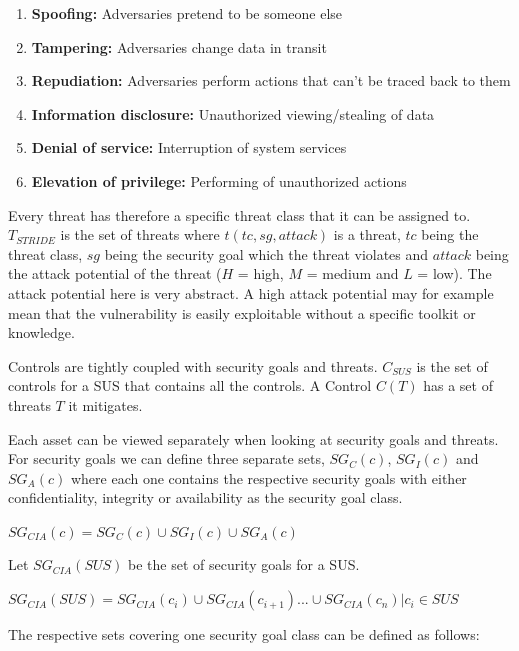 \begin{enumerate}
\item[]\textbf{Spoofing:} Adversaries pretend to be someone else
\item[]\textbf{Tampering:} Adversaries change data in transit
\item[]\textbf{Repudiation:} Adversaries perform actions that can't be traced back to them
\item[]\textbf{Information disclosure:} Unauthorized viewing/stealing of data
\item[]\textbf{Denial of service:} Interruption of system services
\item[]\textbf{Elevation of privilege:} Performing of unauthorized actions
\end{enumerate}

Every threat has therefore a specific threat class that it can be assigned to. $T_{STRIDE}$ is the set of threats where $t(tc, sg, attack)$ is a threat, $tc$ being the threat class, $sg$ being the security goal which the threat violates and $attack$ being the attack potential of the threat ($H$ = high, $M$ = medium and $L$ = low). The attack potential here is very abstract. A high attack potential may for example mean that the vulnerability is easily exploitable without a specific toolkit or knowledge.

Controls are tightly coupled with security goals and threats. $C_{SUS}$ is the set of controls for a SUS that contains all the controls. A Control $C(T)$ has a set of threats $T$ it mitigates.

Each asset can be viewed separately when looking at security goals and threats. For security goals we can define three separate sets, $SG_C(c)$, $SG_I(c)$ and $SG_A(c)$ where each one contains the respective security goals with either confidentiality, integrity or availability as the security goal class.

\begin{theorem}
$SG_{CIA}(c) = SG_C(c) \cup SG_I(c) \cup SG_A(c)$
\end{theorem}

Let $SG_{CIA}(SUS)$ be the set of security goals for a SUS. 

\begin{theorem}
$SG_{CIA}(SUS) = SG_{CIA}(c_i) \cup SG_{CIA}(c_{i+1}) ... \cup SG_{CIA}(c_n) | c_i \in SUS$
\end{theorem}

The respective sets covering one security goal class can be defined as follows:

